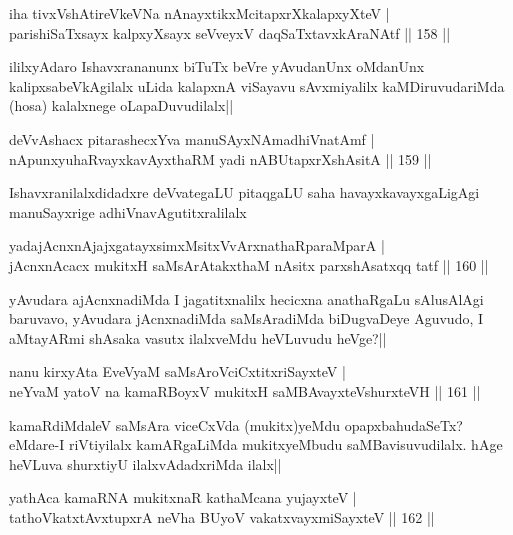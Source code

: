 \begin{shl}
iha tivxVshAtireVkeVNa nAnayxtikxMcitapxrXkalapxyXteV |\\
parishiSaTxsayx kalpxyXsayx seVveyxV daqSaTxtavxkAraNAtf \hfill || 158 ||
\end{shl}

\begin{artha}
ililxyAdaro Ishavxrananunx biTuTx beVre yAvudanUnx oMdanUnx kalipxsabeVkAgilalx uLida kalapxnA viSayavu sAvxmiyalilx kaMDiruvudariMda (hosa) kalalxnege oLapaDuvudilalx||
\end{artha}

\begin{shl}
deVvAshacx pitarashecxYva manuSAyxNAmadhiVnatAmf |\\
nA\s \s punxyuhaRvayxkavAyxthaRM yadi nABUtapxrXshAsitA \hfill || 159 ||
\end{shl}

\begin{artha}
Ishavxranilalxdidadxre deVvategaLU pitaqgaLU saha havayxkavayxgaLigAgi manuSayxrige adhiVnavAgutitxralilalx
\end{artha}

\begin{shl}
yadajAcnxnAjajxgatayxsimxMsitxVvArxnathaRparaMparA |\\
jAcnxnAcacx mukitxH saMsArAtakxthaM nAsitx parxshAsatxqq tatf \hfill || 160 ||
\end{shl}

\begin{artha}
yAvudara ajAcnxnadiMda I jagatitxnalilx hecicxna anathaRgaLu sAlusAlAgi baruvavo, yAvudara jAcnxnadiMda saMsAradiMda biDugvaDeye Aguvudo, I aMtayARmi shAsaka vasutx ilalxveMdu heVLuvudu heVge?||
\end{artha}


\begin{shl}
nanu kirxyAta EveVyaM saMsAroVciCxtitxriSayxteV |\\
neYvaM yatoV na kamaRBoyxV mukitxH saMBAvayxteV\s shurxteVH \hfill || 161 ||
\end{shl}

\begin{artha}
kamaRdiMdaleV saMsAra viceCxVda (mukitx)yeMdu opapxbahudaSeTx? eMdare-I riVtiyilalx kamARgaLiMda mukitxyeMbudu saMBavisuvudilalx. hAge heVLuva shurxtiyU ilalxvAdadxriMda ilalx||
\end{artha}

\begin{shl}
yathAca kamaRNA mukitxnaR kathaMcana yujayxteV |\\
tathoVkatxtAvxtupxrA neVha BUyoV vakatxvayxmiSayxteV \hfill || 162 ||
\end{shl}


